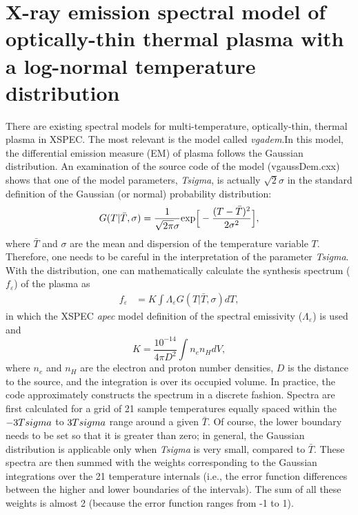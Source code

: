 \documentclass[usenatbib]{mnras}
\begin{document}
\section{X-ray emission spectral model of optically-thin thermal plasma with a log-normal temperature distribution}
\label{a:impl}
There are existing spectral models for multi-temperature, optically-thin, thermal plasma in XSPEC. The most relevant is the model called {\sl vgadem}.In this model, the differential emission measure (EM) of plasma follows the Gaussian distribution.
An examination of the source code of the model (vgaussDem.cxx) shows that one of the model parameters, {\sl Tsigma}, is actually $\sqrt{2} \sigma$ in the
standard definition of the Gaussian (or normal)  probability distribution:
\begin{equation}
  G(T|\bar{T},\sigma)=\dfrac{1}{\sqrt{2\pi } \sigma} {\rm exp}\Big[-\dfrac{(T - \bar{T})^2}{2\sigma^2}\Big],
  \label{e:gau-T}
\end{equation}
where $\bar{T}$ and $\sigma$ are the mean and dispersion of the temperature variable $T$. Therefore, one needs to be careful in the interpretation of the parameter {\sl Tsigma}. 
With the distribution, one can mathematically calculate the synthesis spectrum ($f_\varepsilon$) of the plasma as 
\begin{equation}
\begin{split}
f_\varepsilon & = K \int \Lambda_\varepsilon G(T|\bar{T},\sigma) dT,
\end{split}
\label{e:spec}
\end{equation}
in which the XSPEC {\sl apec} model definition of the spectral emissivity ($\Lambda_\varepsilon $) is used and  
\begin{equation}
K=\dfrac{10^{-14}}{4\pi D^2} \int n_e n_H dV, 
\label{e:snorm}
\end{equation}
where $n_e$ and $n_H$ are the electron and proton number densities,  $D$ is the distance to the source,
and the integration is over its occupied volume.  In practice, the code approximately constructs the spectrum in a discrete fashion. Spectra are first calculated for a grid of  21 sample temperatures equally spaced within the $-3{\sl Tsigma}$ to $3{\sl Tsigma}$ range around a given $\bar{T}$. Of course, the lower boundary needs to be set so that it is greater than zero; in general, the Gaussian distribution is applicable only when {\sl Tsigma} is very small, compared to $\bar{T}$. These spectra are then summed with the weights corresponding to the Gaussian integrations over the 21 
temperature internals (i.e., the error function differences between the
higher and lower boundaries of the intervals). The sum of all these weights is almost 2 (because the error function ranges from -1 to 1).  
\end{document}
